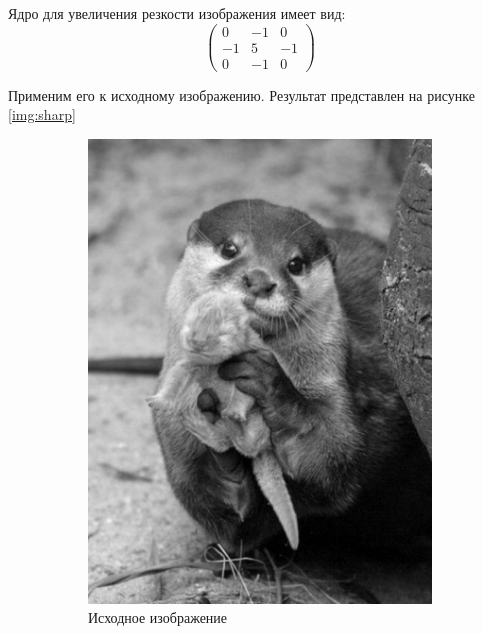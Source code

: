 Ядро для увеличения резкости изображения имеет вид:
\begin{equation}
    \begin{pmatrix}
        0 & -1 & 0 \\
        -1 & 5 & -1 \\
        0 & -1 & 0
    \end{pmatrix}
\end{equation}

Применим его к исходному изображению. Результат представлен на рисунке \ref{img:sharp}

\begin{figure}[ht!]
    \centering
    \begin{subfigure}[b]{0.5\linewidth}
        \centering
        \includegraphics[width=0.95\linewidth]{bw.png}
        \caption{Исходное изображение}
    \end{subfigure}%
    \begin{subfigure}[b]{0.5\linewidth}
        \centering

\end{subfigure}
\end{figure}
